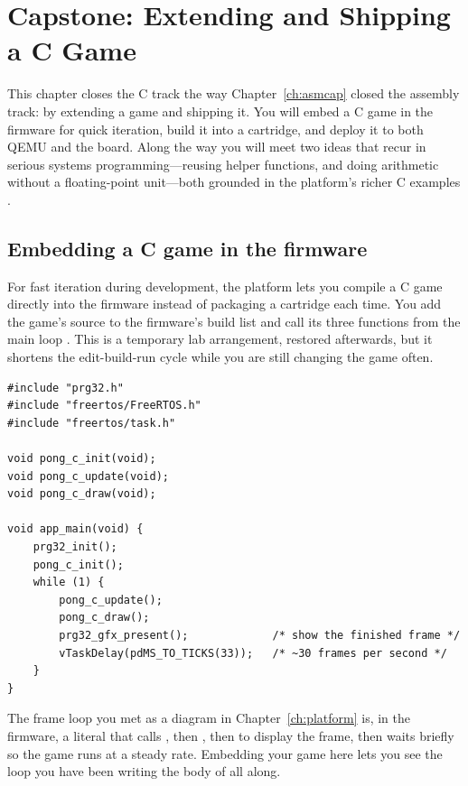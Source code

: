 \chapter{Capstone: Extending and Shipping a C Game}
\label{ch:ccap}

This chapter closes the C track the way Chapter~\ref{ch:asmcap} closed the
assembly track: by extending a game and shipping it. You will embed a C game in
the firmware for quick iteration, build it into a  cartridge, and
deploy it to both QEMU and the board. Along the way you will meet two ideas that
recur in serious systems programming---reusing helper functions, and doing
arithmetic without a floating-point unit---both grounded in the platform's richer
C examples \citep{prg32tutorialc,prg32repo}.

\section{Embedding a C game in the firmware}

For fast iteration during development, the platform lets you compile a C game
directly into the firmware instead of packaging a cartridge each time. You add the
game's source to the firmware's build list and call its three functions from the
main loop \citep{prg32tutorialc}. This is a temporary lab arrangement, restored
afterwards, but it shortens the edit-build-run cycle while you are still changing
the game often.

\begin{lstlisting}[style=c,caption={Calling a C game's three functions from the firmware's main loop. \texttt{init} once, then \texttt{update} and \texttt{draw} each frame, with a present and a short delay.}]
#include "prg32.h"
#include "freertos/FreeRTOS.h"
#include "freertos/task.h"

void pong_c_init(void);
void pong_c_update(void);
void pong_c_draw(void);

void app_main(void) {
    prg32_init();
    pong_c_init();
    while (1) {
        pong_c_update();
        pong_c_draw();
        prg32_gfx_present();             /* show the finished frame */
        vTaskDelay(pdMS_TO_TICKS(33));   /* ~30 frames per second */
    }
}
\end{lstlisting}

\begin{prgconcept}
The frame loop you met as a diagram in Chapter~\ref{ch:platform} is, in the
firmware, a literal  that calls , then ,
then  to display the frame, then waits briefly so the
game runs at a steady rate. Embedding your game here lets you see the loop you have
been writing the body of all along.
\end{prgconcept}

